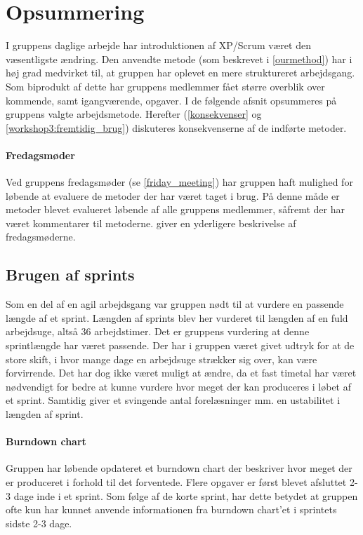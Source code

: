 \section{Opsummering}\label{workshop3:opsummering}
I gruppens daglige arbejde har introduktionen af XP/Scrum været den væsentligste ændring.
Den anvendte metode (som beskrevet i \cref{ourmethod}) har i høj grad medvirket til, at gruppen har oplevet en mere struktureret arbejdsgang.
Som biprodukt af dette har gruppens medlemmer fået større overblik over kommende, samt igangværende, opgaver.
I de følgende afsnit opsummeres på gruppens valgte arbejdsmetode.
Herefter (\cref{konsekvenser} og \cref{workshop3:fremtidig_brug}) diskuteres konsekvenserne af de indførte metoder.

\paragraph{Fredagsmøder}
Ved gruppens fredagsmøder (se \cref{friday_meeting}) har gruppen haft mulighed for løbende at evaluere de metoder der har været taget i brug.
På denne måde er metoder blevet evalueret løbende af alle gruppens medlemmer, såfremt der har været kommentarer til metoderne.
 giver en yderligere beskrivelse af fredagsmøderne.

\subsection{Brugen af sprints}
Som en del af en agil arbejdsgang var gruppen nødt til at vurdere en passende længde af et sprint.
Længden af sprints blev her vurderet til længden af en fuld arbejdsuge, altså 36 arbejdstimer.
Det er gruppens vurdering at denne sprintlængde har været passende.
Der har i gruppen været givet udtryk for at de store skift, i hvor mange dage en arbejdsuge strækker sig over, kan være forvirrende.
Det har dog ikke været muligt at ændre, da et fast timetal har været nødvendigt for bedre at kunne vurdere hvor meget der kan produceres i løbet af et sprint.
Samtidig giver et svingende antal forelæsninger mm. en ustabilitet i længden af sprint.

\paragraph{Burndown chart}
Gruppen har løbende opdateret et burndown chart der beskriver hvor meget der er produceret i forhold til det forventede.
Flere opgaver er først blevet afsluttet 2-3 dage inde i et sprint.
Som følge af de korte sprint, har dette betydet at gruppen ofte kun har kunnet anvende informationen fra burndown chart'et i sprintets sidste 2-3 dage.

